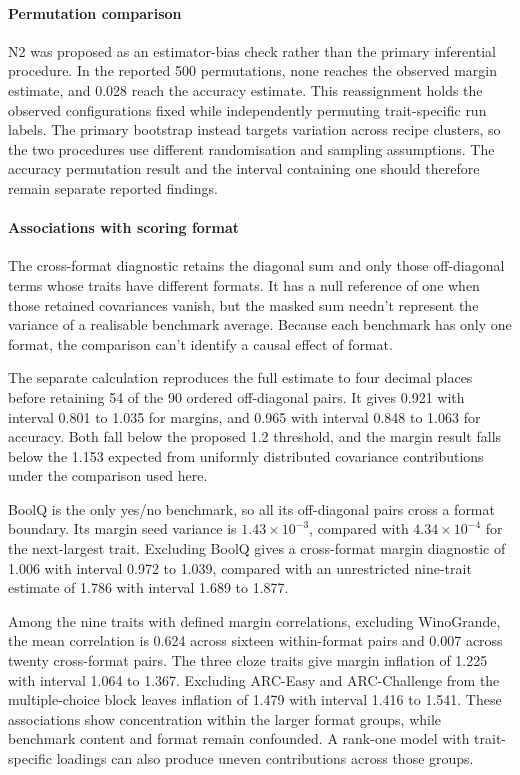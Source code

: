 \paragraph{Permutation comparison}
N2 was proposed as an estimator-bias check rather than the primary inferential procedure. In the reported 500 permutations, none reaches the observed margin estimate, and 0.028 reach the accuracy estimate. This reassignment holds the observed configurations fixed while independently permuting trait-specific run labels. The primary bootstrap instead targets variation across recipe clusters, so the two procedures use different randomisation and sampling assumptions. The accuracy permutation result and the interval containing one should therefore remain separate reported findings.

\paragraph{Associations with scoring format}
The cross-format diagnostic retains the diagonal sum and only those off-diagonal terms whose traits have different formats. It has a null reference of one when those retained covariances vanish, but the masked sum needn't represent the variance of a realisable benchmark average. Because each benchmark has only one format, the comparison can't identify a causal effect of format.

The separate calculation reproduces the full estimate to four decimal places before retaining 54 of the 90 ordered off-diagonal pairs. It gives 0.921 with interval 0.801 to 1.035 for margins, and 0.965 with interval 0.848 to 1.063 for accuracy. Both fall below the proposed 1.2 threshold, and the margin result falls below the 1.153 expected from uniformly distributed covariance contributions under the comparison used here.

BoolQ is the only yes/no benchmark, so all its off-diagonal pairs cross a format boundary. Its margin seed variance is $1.43\times10^{-3}$, compared with $4.34\times10^{-4}$ for the next-largest trait. Excluding BoolQ gives a cross-format margin diagnostic of 1.006 with interval 0.972 to 1.039, compared with an unrestricted nine-trait estimate of 1.786 with interval 1.689 to 1.877.

Among the nine traits with defined margin correlations, excluding WinoGrande, the mean correlation is 0.624 across sixteen within-format pairs and 0.007 across twenty cross-format pairs. The three cloze traits give margin inflation of 1.225 with interval 1.064 to 1.367. Excluding ARC-Easy and ARC-Challenge from the multiple-choice block leaves inflation of 1.479 with interval 1.416 to 1.541. These associations show concentration within the larger format groups, while benchmark content and format remain confounded. A rank-one model with trait-specific loadings can also produce uneven contributions across those groups.

